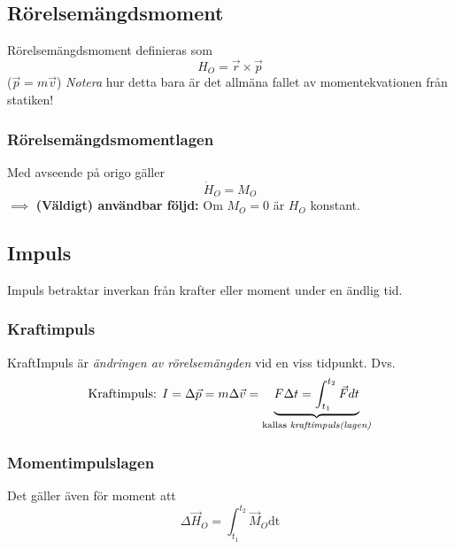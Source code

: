 \documentclass{article}
\newenvironment{ankiflashcard}[1]{}{}
\begin{document}
\begin{paracol}{2}
\begin{ankiflashcard}{Definiera rörelsemängdsmoment}
    
\subsection{Rörelsemängdsmoment}
Rörelsemängdsmoment definieras som
$$
H_O = \vec r \times \vec p
$$
($\vec p = m \vec v$)
\textit{Notera} hur detta bara är det allmäna fallet av momentekvationen från statiken!
\end{ankiflashcard}


\begin{ankiflashcard}{Definiera rörelsemängdsmomentlagen.}
\subsubsection{Rörelsemängdsmomentlagen}
Med avseende på origo gäller
$$
\dot H_O = M_O
$$
$\implies$ \textbf{(Väldigt) användbar följd:} Om $M_O=0$ är $H_O$ konstant.
\end{ankiflashcard}


\begin{ankiflashcard}{Definiera vad kraftimpuls är. Definiera även kraftimpulslagen.}
\subsection{Impuls}
Impuls betraktar inverkan från krafter eller moment under en ändlig tid.
\subsubsection{Kraftimpuls}
KraftImpuls är \textit{ändringen av rörelsemängden} vid en viss tidpunkt. Dvs.
$$\text{Kraftimpuls: } I = \Delta \vec p = m \Delta \vec v = \underbrace{F\Delta t =  \int_{t_1}^{t_2} \vec F dt}_{\text{kallas \textit{kraftimpuls(lagen)}}}$$
\end{ankiflashcard}

\begin{ankiflashcard}{Definera momentinpulslagen}
    
\subsubsection{Momentimpulslagen}
Det gäller även för moment att
$$
\Delta \vec H_O = \int_{t_1}^{t_2} \vec M_O \text{dt}
$$
\end{ankiflashcard}


\end{paracol}
\end{document}
